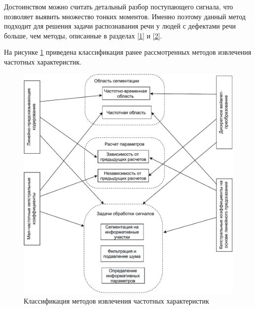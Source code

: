 Достоинством можно считать детальный разбор поступающего сигнала, что позволяет выявить множество тонких моментов. Именно поэтому данный метод подходит для решения задачи распознавания речи у людей с дефектами речи больше, чем методы, описанные в разделах \ref{1} и \ref{2}.

На рисунке \ref{fig:class} приведена классификация ранее рассмотренных методов извлечения частотных характеристик.

\begin{figure}[h]
	\begin{center}
	\includegraphics[pages=-, scale=0.85]{./inc/img/4.pdf}
	\caption{Классификация методов извлечения частотных характеристик}  
	\label{fig:class}
\end{center}
\end{figure}


